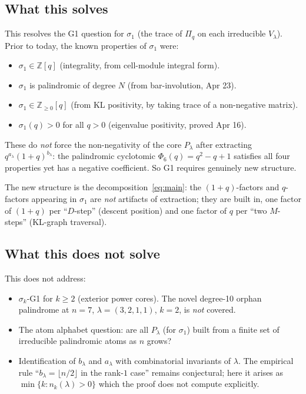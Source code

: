 \documentclass[11pt]{article}
\theoremstyle{plain}
\theoremstyle{definition}
\theoremstyle{remark}
\newcommand{\Z}{\mathbb{Z}}
\newcommand{\Pibs}{\Pi_q}
\begin{document}
\subsection*{What this solves}
This resolves the G1 question for $\sigma_1$ (the trace of $\Pibs$ on each irreducible $V_\lambda$). Prior to today, the known properties of $\sigma_1$ were:
\begin{itemize}
    \item $\sigma_1 \in \Z[q]$ (integrality, from cell-module integral form).
    \item $\sigma_1$ is palindromic of degree $N$ (from bar-involution, Apr 23).
    \item $\sigma_1 \in \Z_{\geq 0}[q]$ (from KL positivity, by taking trace of a non-negative matrix).
    \item $\sigma_1(q) > 0$ for all $q > 0$ (eigenvalue positivity, proved Apr 16).
\end{itemize}
These do \emph{not} force the non-negativity of the core $P_\lambda$ after extracting $q^{a_\lambda}(1+q)^{b_\lambda}$: the palindromic cyclotomic $\Phi_6(q) = q^2 - q + 1$ satisfies all four properties yet has a negative coefficient. So G1 requires genuinely new structure.

The new structure is the decomposition~\eqref{eq:main}: the $(1+q)$-factors and $q$-factors appearing in $\sigma_1$ are \emph{not} artifacts of extraction; they are built in, one factor of $(1+q)$ per ``$D$-step'' (descent position) and one factor of $q$ per ``two $M$-steps'' (KL-graph traversal).

\subsection*{What this does not solve}
This does not address:
\begin{itemize}
    \item $\sigma_k$-G1 for $k \geq 2$ (exterior power cores). The novel degree-10 orphan palindrome at $n=7$, $\lambda = (3, 2, 1, 1)$, $k = 2$, is \emph{not} covered.
    \item The atom alphabet question: are all $P_\lambda$ (for $\sigma_1$) built from a finite set of irreducible palindromic atoms as $n$ grows?
    \item Identification of $b_\lambda$ and $a_\lambda$ with combinatorial invariants of $\lambda$. The empirical rule ``$b_\lambda = \lfloor n/2 \rfloor$ in the rank-$1$ case'' remains conjectural; here it arises as $\min\{k : n_k(\lambda) > 0\}$ which the proof does not compute explicitly.
\end{itemize}
\end{document}
